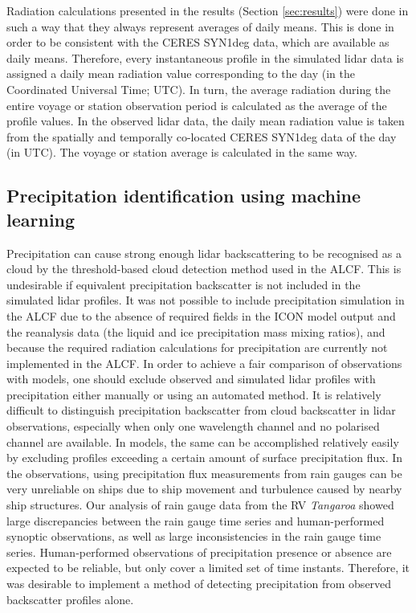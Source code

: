 \documentclass[12pt,a4paper]{article}
\begin{document}
Radiation calculations presented in the results (Section \ref{sec:results})
were done in such a way that they always represent averages of daily means.
This is done in order to be consistent with the CERES SYN1deg data, which are
available as daily means. Therefore, every instantaneous profile in the
simulated lidar data is assigned a daily mean radiation value corresponding to
the day (in the Coordinated Universal Time; UTC). In turn, the average
radiation during the entire voyage or station observation period is calculated
as the average of the profile values. In the observed lidar data, the daily
mean radiation value is taken from the spatially and temporally co-located
CERES SYN1deg data of the day (in UTC). The voyage or station average is
calculated in the same way.

\subsection{Precipitation identification using machine learning}
\label{sec:ann}

Precipitation can cause strong enough lidar backscattering to be recognised as
a cloud by the threshold-based cloud detection method used in the ALCF. This is
undesirable if equivalent precipitation backscatter is not included in the
simulated lidar profiles. It was not possible to include precipitation
simulation in the ALCF due to the absence of required fields in the ICON model
output and the reanalysis data (the liquid and ice precipitation mass mixing
ratios), and because the required radiation calculations for precipitation are
currently not implemented in the ALCF. In order to achieve a fair comparison of
observations with models, one should exclude observed and simulated lidar
profiles with precipitation either manually or using an automated method. It is
relatively difficult to distinguish precipitation backscatter from cloud
backscatter in lidar observations, especially when only one wavelength channel
and no polarised channel are available. In models, the same can be accomplished
relatively easily by excluding profiles exceeding a certain amount of surface
precipitation flux. In the observations, using precipitation flux measurements
from rain gauges can be very unreliable on ships due to ship movement and
turbulence caused by nearby ship structures. Our analysis of rain gauge data
from the RV \emph{Tangaroa} showed large discrepancies between the rain gauge
time series and human-performed synoptic observations, as well as large
inconsistencies in the rain gauge time series. Human-performed observations of
precipitation presence or absence are expected to be reliable, but only cover a
limited set of time instants. Therefore, it was desirable to implement a method
of detecting precipitation from observed backscatter profiles alone.
\end{document}
